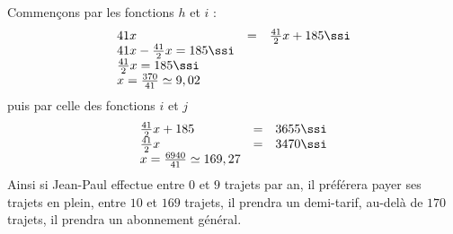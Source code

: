 \begin{exemple}
Commençons par les fonctions $h$ et $i$ :
$$
\begin{array}{lcl}
41 x &=& \frac{41}{2} x + 185 \ssi \\
41x - \frac{41}{2}x = 185 \ssi \\
\frac{41}{2} x = 185 \ssi \\
x = \frac{370}{41} \simeq 9,02
\end{array}
$$
puis par celle des fonctions $i$ et $j$
$$
\begin{array}{lcl}
\frac{41}{2}x + 185 &=& 3655 \ssi \\
\frac{41}{2} x &=& 3470 \ssi \\
x = \frac{6940}{41} \simeq 169,27
\end{array}
$$
Ainsi si Jean-Paul effectue entre $0$ et $9$ trajets par an, il préférera payer ses trajets en plein, entre $10$ et $169$ trajets, il prendra un demi-tarif, au-delà de $170$ trajets, il prendra un abonnement général.
\end{exemple}
